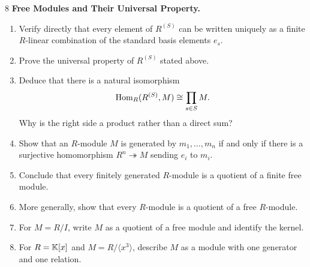 \documentclass[Notebook.tex]{subfiles}
\begin{document}
    \begin{problem}{8}
        \textbf{Free Modules and Their Universal Property.}
        \begin{enumerate}
        \item Verify directly that every element of $R^{(S)}$ can be written uniquely as a finite $R$-linear combination of the standard basis elements $e_s$.
        \item Prove the universal property of $R^{(S)}$ stated above.
        \item Deduce that there is a natural isomorphism
        \[
        \operatorname{Hom}_R(R^{(S)},M)\cong \prod_{s\in S}M.
        \]
        Why is the right side a product rather than a direct sum?
        \item Show that an $R$-module $M$ is generated by $m_1,\ldots,m_n$ if and only if there is a surjective homomorphism $R^n\twoheadrightarrow M$ sending $e_i$ to $m_i$.
        \item Conclude that every finitely generated $R$-module is a quotient of a finite free module.
        \item More generally, show that every $R$-module is a quotient of a free $R$-module.
        \item For $M=R/I$, write $M$ as a quotient of a free module and identify the kernel.
        \item For $R=\mathbb K[x]$ and $M=R/\langle x^3\rangle$, describe $M$ as a module with one generator and one relation.
        \end{enumerate}
    \end{problem}
\end{document}
